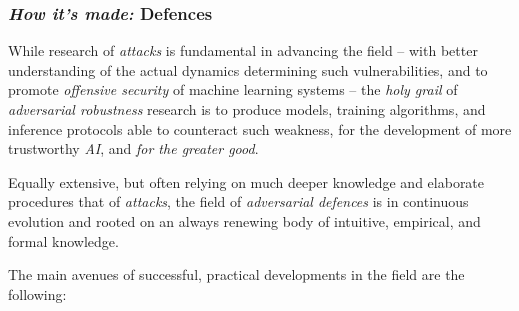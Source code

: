 \subsubsection{\textit{How it's made:} Defences}
While research of \textit{attacks} is fundamental in advancing the field -- with better understanding of the actual dynamics determining such vulnerabilities, and to promote \textit{offensive security} of machine learning systems -- the \textit{holy grail} of \textit{adversarial robustness} research is to produce models, training algorithms, and inference protocols able to counteract such weakness, for the development of more trustworthy \textit{AI}, and \textit{for the greater good}.

Equally extensive, but often relying on much deeper knowledge and elaborate procedures \wrt that of \textit{attacks}, the field of \textit{adversarial defences} is in continuous evolution and rooted on an always renewing body of intuitive, empirical, and formal knowledge.

The main avenues of successful, practical developments in the field are the following:

